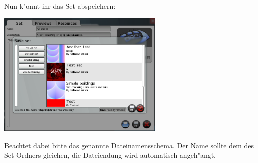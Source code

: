 \documentclass[a4paper]{article}
\begin{document}
Nun k"onnt ihr das Set abspeichern:
\begin{center}
\includegraphics[width=80mm]{../images/setcreator/saving.png}
\end{center}

Beachtet dabei bitte das genannte Dateinamensschema. Der Name sollte dem des Set-Ordners gleichen, die Dateiendung wird automatisch angeh"angt.
\end{document}

